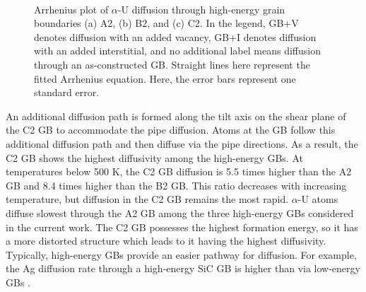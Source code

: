 \documentclass[review]{elsarticle}
\providecommand{\DIFaddbeginFL}{} %
\providecommand{\DIFaddendFL}{} %
\providecommand{\DIFdelbeginFL}{} %
\providecommand{\DIFdelendFL}{} %
\newcommand{\DIFscaledelfig}{0.5}
\newlength{\DIFdelgraphicswidth} %
\newlength{\DIFdelgraphicsheight} %
\newcommand{\DIFaddincludegraphics}[2][]{{\color{blue}\fbox{\DIFOincludegraphics[#1]{#2}}}} %
\newcommand{\DIFdelincludegraphics}[2][]{%
\sbox{\DIFdelgraphicsbox}{\DIFOincludegraphics[#1]{#2}}%
\settoboxwidth{\DIFdelgraphicswidth}{\DIFdelgraphicsbox} %
\settoboxtotalheight{\DIFdelgraphicsheight}{\DIFdelgraphicsbox} %
\scalebox{\DIFscaledelfig}{%
\parbox[b]{\DIFdelgraphicswidth}{\usebox{\DIFdelgraphicsbox}\\[-\baselineskip] \rule{\DIFdelgraphicswidth}{0em}}\llap{\resizebox{\DIFdelgraphicswidth}{\DIFdelgraphicsheight}{%
\setlength{\unitlength}{\DIFdelgraphicswidth}%
\begin{picture}(1,1)%
\thicklines\linethickness{2pt} %
{\color[rgb]{1,0,0}\put(0,0){\framebox(1,1){}}}%
{\color[rgb]{1,0,0}\put(0,0){\line( 1,1){1}}}%
{\color[rgb]{1,0,0}\put(0,1){\line(1,-1){1}}}%
\end{picture}%
}\hspace*{3pt}}} %
} %
\DeclareRobustCommand{\DIFaddbeginFL}{\DIFOaddbeginFL \let\includegraphics\DIFaddincludegraphics} %
\DeclareRobustCommand{\DIFaddendFL}{\DIFOaddendFL \let\includegraphics\DIFOincludegraphics} %
\DeclareRobustCommand{\DIFdelbeginFL}{\DIFOdelbeginFL \let\includegraphics\DIFdelincludegraphics} %
\DeclareRobustCommand{\DIFdelendFL}{\DIFOaddendFL \let\includegraphics\DIFOincludegraphics} %
\begin{document}
\begin{figure}[h!]
\centering
\DIFdelbeginFL %
\DIFdelendFL \DIFaddbeginFL {}
\DIFaddendFL \\
\caption{Arrhenius plot of $\alpha$-U diffusion through high-energy grain boundaries (a) A2, (b) B2, and (c) C2. In the legend, GB+V denotes diffusion with an added vacancy, GB+I denotes diffusion with an added interstitial, and no additional label means diffusion through an as-constructed GB. Straight lines here represent the fitted Arrhenius equation. Here, the error bars represent one standard error.}
\label{fig:Dif_fit2}
\end{figure}

An additional diffusion path is formed along the tilt axis on the shear plane of the C2 GB to accommodate the pipe diffusion. Atoms at the GB follow this additional diffusion path and then diffuse via the pipe directions. As a result, the C2 GB shows the highest diffusivity among the high-energy GBs. At temperatures below 500 K, the C2 GB diffusion is 5.5 times higher than the A2 GB and 8.4 times higher than the B2 GB. This ratio decreases with increasing temperature, but diffusion in the C2 GB remains the most rapid. $\alpha$-U atoms diffuse slowest through the A2 GB among the three high-energy GBs considered in the current work. The C2 GB possesses the highest formation energy, so it has a more distorted structure which leads to it having the highest diffusivity. Typically, high-energy GBs provide an easier pathway for diffusion. For example, the Ag diffusion rate through a high-energy SiC GB is higher than via low-energy GBs \cite{SiC_HE}.
\end{document}
